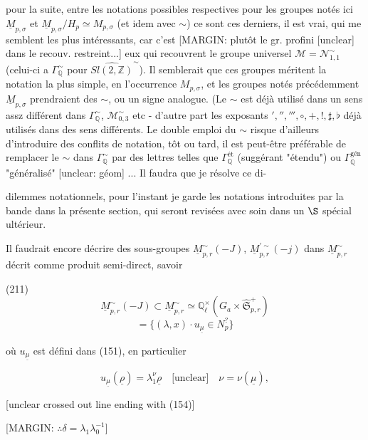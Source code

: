 pour la suite, entre les notations possibles
respectives pour les groupes notés ici
$\underline{M}_{p,\sigma}$ et $\underline{M}_{p,\sigma} / H_p \simeq M_{p,\sigma}$ (et idem avec $\sim$)
ce sont ces derniers, il est vrai, qui me
semblent les plus intéressants, car c'est
[MARGIN: plutôt le gr. profini [unclear] dans le recouv. restreint...]
eux qui recouvrent le groupe universel
$\mathcal{M} = \mathcal{N}_{1,1}^\sim$ (celui-ci a $\Gamma_{\mathbb{Q}}^\sim$ pour $\widehat{Sl(2,\mathbb{Z})}^\sim$).
Il semblerait que ces groupes méritent
la notation la plus simple, en l'occurrence
$M_{p,\sigma}$, et les groupes notés précédemment
$\underline{M}_{p,\sigma}$ prendraient des $\sim$, ou un
signe analogue. (Le $\sim$ est déjà utilisé
dans un sens assz différent dans $\Gamma_{\mathbb{Q}}^\sim$,
$\mathcal{M}_{0,3}^\sim$ etc - d'autre part les
exposants $', '', ''', \circ, +, !, \sharp, \flat$ déjà utilisés
dans des sens différents. Le double emploi
du $\sim$ risque d'ailleurs d'introduire
des conflits de notation, tôt ou tard,
il est peut-être préférable de remplacer
le $\sim$ dans $\Gamma_{\mathbb{Q}}^\sim$ par des lettres telles que $\Gamma_{\mathbb{Q}}^{\text{ét}}$
(suggérant "étendu") ou $\Gamma_{\mathbb{Q}}^{\text{gén}}$ "généralisé"
[unclear: géom] ... Il faudra que je résolve ce di-

\newpage


dilemmes notationnels, pour l'instant je garde les notations introduites par la bande dans la présente section, qui seront revisées avec soin dans un $\S$ spécial ultérieur.

Il faudrait encore décrire des sous-groupes $\underline{M}_{p, r}^\sim (-J)$, $\underline{M}_{p, r}^{\prime \sim} (-j)$ dans $\underline{M}_{p, r}^\sim$ décrit comme produit semi-direct, savoir

(211) $$ \underline{M}_{p, r}^\sim (-J) \subset \underline{M}_{p, r}^\sim \simeq \mathbb{Q}_\ell^\times (G_a \times \widehat{\mathfrak{S}}_{p,r}^+) $$
$$ = \{ (\lambda, x) \cdot u_{\underline{\mu}} \in N_p^? \} $$

où $u_{\underline{\mu}}$ est défini dans (151), en particulier

$$ u_{\underline{\mu}}(\underline{\rho}) = \lambda_1^\nu \underline{\rho} \quad \text{[unclear]} \quad \nu = \nu(\underline{\mu}) , $$

[unclear crossed out line ending with (154)]

[MARGIN: $\therefore \delta = \lambda_1 \lambda_0^{-1}$]

